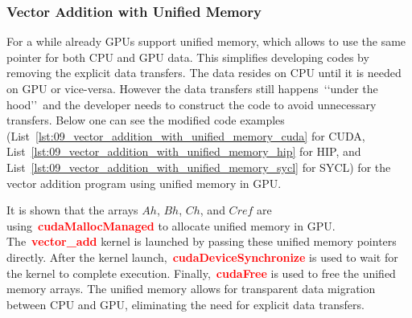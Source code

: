 \subsubsection{Vector Addition with Unified Memory}


\par
For a while already GPUs support unified memory, which allows to use the same pointer for both CPU and GPU data.
This simplifies developing codes by removing the explicit data transfers.
The data resides on CPU until it is needed on GPU or vice-versa.
However the data transfers still happens~\lq\lq under the hood\rq\rq~and the developer needs to construct the code to avoid unnecessary transfers.
Below one can see the modified code examples (List~\ref{lst:09_vector_addition_with_unified_memory_cuda} for CUDA, List~\ref{lst:09_vector_addition_with_unified_memory_hip} for HIP, and List~\ref{lst:09_vector_addition_with_unified_memory_sycl} for SYCL) for the vector addition program using unified memory in GPU.











\par
It is shown that the arrays $Ah$, $Bh$, $Ch$, and $Cref$ are using~\textbf{\textcolor{red}{cudaMallocManaged}} to allocate unified memory in GPU.
The~\textbf{\textcolor{red}{vector\_add}} kernel is launched by passing these unified memory pointers directly.
After the kernel launch,~\textbf{\textcolor{red}{cudaDeviceSynchronize}} is used to wait for the kernel to complete execution.
Finally,~\textbf{\textcolor{red}{cudaFree}} is used to free the unified memory arrays.
The unified memory allows for transparent data migration between CPU and GPU, eliminating the need for explicit data transfers.


